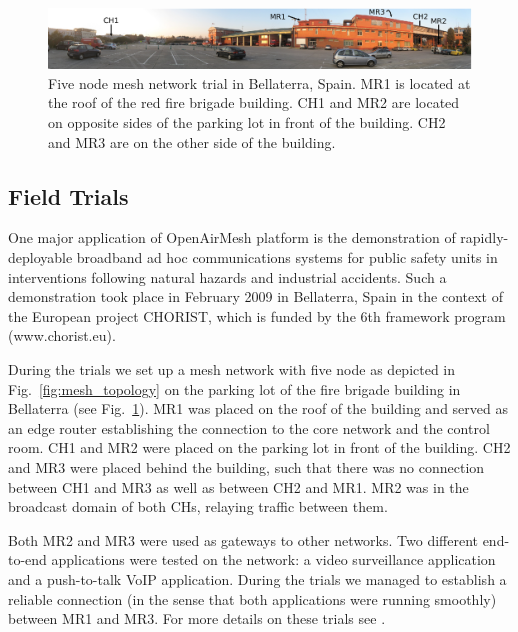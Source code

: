 \documentclass[a4paper,twocolumn,journal]{IEEEtran}
\begin{document}
\begin{figure}
 \includegraphics[width=\textwidth]{figures/pano_5nodes_annotated_300dpi}
\caption{Five node mesh network trial in Bellaterra, Spain. MR1 is located at the roof of the red fire brigade building. CH1 and MR2 are located on opposite sides of the parking lot in front of the building. CH2 and MR3 are on the other side of the building.}
\label{fig:mesh_5nodes}
\end{figure}

\subsection{Field Trials}
\label{sec:trial}


One major application of OpenAirMesh platform is the demonstration of rapidly-deployable broadband ad hoc communications systems for public safety units in interventions following natural hazards and industrial accidents. Such a demonstration took place in February 2009 in Bellaterra, Spain in the context of the European project CHORIST, which is funded by the 6th framework program (www.chorist.eu). 


During the trials we set up a mesh network with five node as depicted in Fig.\ \ref{fig:mesh_topology} on the parking lot of the fire brigade building in Bellaterra (see Fig.\ \ref{fig:mesh_5nodes}). MR1 was placed on the roof of the building and served as an edge router establishing the connection to the core network and the control room. CH1 and MR2 were placed on the parking lot in front of the building. CH2 and MR3 were placed behind the building, such that there was no connection between CH1 and MR3 as well as between CH2 and MR1. MR2 was in the broadcast domain of both CHs, relaying traffic between them.

Both MR2 and MR3 were used as gateways to other networks. Two different end-to-end applications were tested on the network: a video surveillance application and a push-to-talk VoIP application. During the trials we managed to establish a reliable connection (in the sense that both applications were running smoothly) between MR1 and MR3. For more details on these trials see \cite{chorist_trials}.
\end{document}

